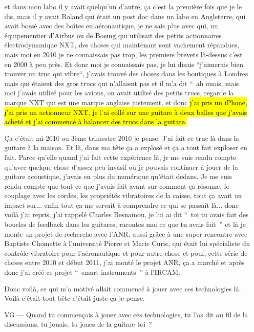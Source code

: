 et dans mon labo il y avait quelqu'un d'autre, ça c'est la première fois que je le dis, mais il y avait Roland qui était un post doc dans un labo en Angleterre, qui avait bossé avec des boîtes en aéronautique, je ne sais plus avec qui, un équipementier d'Airbus ou de Boeing qui utilisait des petits actionnaires électrodynamique NXT, des choses qui maintenant sont vachement répandues, mais moi en 2010 je ne connaissais pas trop, les premiers brevets là-dessus c'est en 2000 à peu près. Et donc moi je connaissais pas, je lui disais “j'aimerais bien trouver un truc qui vibre“, j'avais trouvé des choses dans les boutiques à Londres mais qui étaient des gros trucs qui n'allaient pas et il m'a dit “ ah ouais, mais moi j'avais utilisé pour les avions, on avait utilisé des petits trucs, regarde la marque NXT qui est une marque anglaise justement, et donc \hl{j'ai pris un iPhone, j'ai pris un actionneur NXT, je l'ai collé sur une guitare à deux balles que j'avais acheté et j'ai commencé à balancer des trucs dans la guitare.} 

Ça c'était mi-2010 ou 3ème trimestre 2010 je pense. J'ai fait ce truc là dans la guitare à la maison. Et là, dans ma tête ça a explosé et ça a tout fait exploser en fait. Parce qu'elle quand j'ai fait cette expérience là, je me suis rendu compte qu'avec quelque chose d'assez peu invasif où je pouvais continuer à jouer de la guitare acoustique, j'avais en plus du numérique qu'était dedans. Je me suis rendu compte que tout ce que j'avais fait avant sur comment ça résonne, le couplage avec les cordes, les propriétés vibratoires de la caisse, tout ça avait un impact sur... enfin tout ça me servait à comprendre ce qui se passait là... donc voilà j'ai repris, j'ai rappelé Charles Besnainou, je lui ai dit “ toi tu avais fait des boucles de feedback dans les guitares, racontes moi ce que tu avais fait ” et là je monte un projet de recherche avec l'ANR, aussi grâce à une super rencontre avec Baptiste Chomette à l'université Pierre et Marie Curie, qui était lui spécialiste du contrôle vibratoire pour l'aéronautique et pour autre chose et pouf, cette série de choses entre 2010 et début 2011, j'ai monté le projet ANR, ça a marché et après donc j'ai créé ce projet “ smart instruments ” à l'IRCAM. 

Donc voilà, ce qui m'a motivé allait commencé à jouer avec ces technologies là. Voilà c'était tout bête c'était juste ça je pense. 

VG — Quand tu commençais à jouer avec ces technologies, tu l'as dit au fil de la discussions, tu jouais, tu joues de la guitare toi ? 

